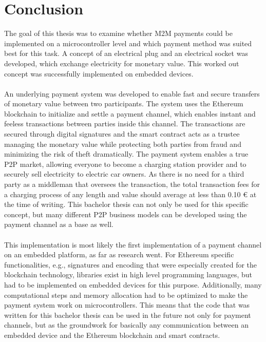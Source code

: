 \section{Conclusion}
The goal of this thesis was to examine whether M2M payments could be implemented on a microcontroller level and which payment method was suited best for this task.
A concept of an electrical plug and an electrical socket was developed, which exchange electricity for monetary value.
This worked out concept was successfully implemented on embedded devices.
\\\\
An underlying payment system was developed to enable fast and secure transfers of monetary value between two participants.
The system uses the Ethereum blockchain to initialize and settle a payment channel, which enables instant and feeless transactions between parties inside this channel.
The transactions are secured through digital signatures and the smart contract acts as a trustee managing the monetary value while protecting both parties from fraud and minimizing the risk of theft dramatically.
The payment system enables a true P2P market, allowing everyone to become a charging station provider and to securely sell electricity to electric car owners.
As there is no need for a third party as a middleman that oversees the transaction, the total transaction fees for a charging process of any length and value should average at less than 0.10 \euro{} at the time of writing.
This bachelor thesis can not only be used for this specific concept, but many different P2P business models can be developed using the payment channel as a base as well.
\\\\
This implementation is most likely the first implementation of a payment channel on an embedded platform, as far as research went.
For Ethereum specific functionalities, e.g., signatures and encoding that were especially created for the blockchain technology, libraries exist in high level programming languages, but had to be implemented on embedded devices for this purpose.
Additionally, many computational steps and memory allocation had to be optimized to make the payment system work on microcontrollers.
This means that the code that was written for this bachelor thesis can be used in the future not only for payment channels, but as the groundwork for basically any communication between an embedded device and the Ethereum blockchain and smart contracts.
\\\\
